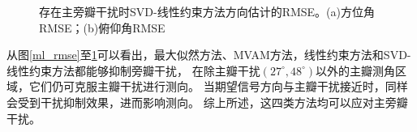 \documentclass[master]{thesis-uestc}
\begin{document}
\begin{figure}[H]
    \caption{存在主旁瓣干扰时SVD-线性约束方法方向估计的RMSE。(a)方位角RMSE；(b)俯仰角RMSE}
    \label{svd_jlc_rmse}
\end{figure}

从图\ref{ml_rmse}至\ref{svd_jlc_rmse}可以看出，最大似然方法、MVAM方法，线性约束方法和SVD-线性约束方法都能够抑制旁瓣干扰，
在除主瓣干扰$(27^\circ,48^\circ)$以外的主瓣测角区域，它们仍可克服主瓣干扰进行测向。
当期望信号方向与主瓣干扰接近时，同样会受到干扰抑制效果，进而影响测向。
综上所述，这四类方法均可以应对主旁瓣干扰。
\end{document}
